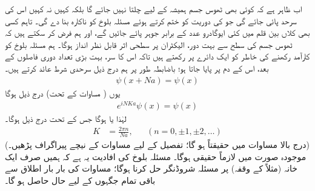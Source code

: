 اب ظاہر ہے کہ کوئی بھی ٹھوس جسم ہمیشہ کے لیے چلتا نہیں جائے گا بلکہ کہیں نہ کہیں اس کی سرحد پائی جائے گی جو  کی دوریت کو ختم کرتے ہوئے مسئلہ بلوخ کو ناکارہ بنا دے گی۔ تاہم کسی بھی کلاں بین قلم میں کئی ایوگادرو عدد کے برابر جوہر پائے جائیں گے، اور ہم فرض کر سکتے ہیں کہ ٹھوس جسم کی سطح سے بہت دور، الیکٹران پر سطحی اثر قابل نظر انداز ہوگا۔ ہم مسئلہ بلوخ کو کارآمد رکھنے کی خاطر  کو ایک دائرے پر رکھتے ہیں تاکہ اس کا سر، بہت بڑی تعداد  دوری فاصلوں کے بعد، اس کے دم پر پایا جاتا ہو؛ باضابطہ طور پر ہم درج ذیل سرحدی شرط عائد کرتے ہیں۔ 
\begin{align}
	\psi(x+Na) = \psi(x)
\end{align}
یوں ( مساوات  کے تحت) درج ذیل ہوگا
\begin{align*}
	e^{iNKa}\psi(x) = \psi(x)
\end{align*}
لہٰذا  یا  ہوگا جس کے تحت درج ذیل ہوگا۔
\begin{align}\label{مساوات_متماثل_مستقلات_قیمتیں}
	K &= \frac{2\pi n}{Na}, &&(n = 0, \pm1, \pm2, \dotsc)
\end{align}
 (درج بالا مساوات میں حقیقتاً  ہو گا؛ تفصیل کے لیے مساوات  کے نیچے پیراگراف پڑھیں۔) موجودہ صورت میں  لازماً حقیقی ہوگا۔ مسئلہ بلوخ کی افادیت یہ ہے کہ ہمیں صرف ایک خانہ (مثلاً  کے وقفہ) پر مسئلہ شروڈنگر حل کرنا ہوگا؛ مساوات  کی بار بار اطلاق سے باقی تمام جگہوں کے لیے حال حاصل ہو گا۔


